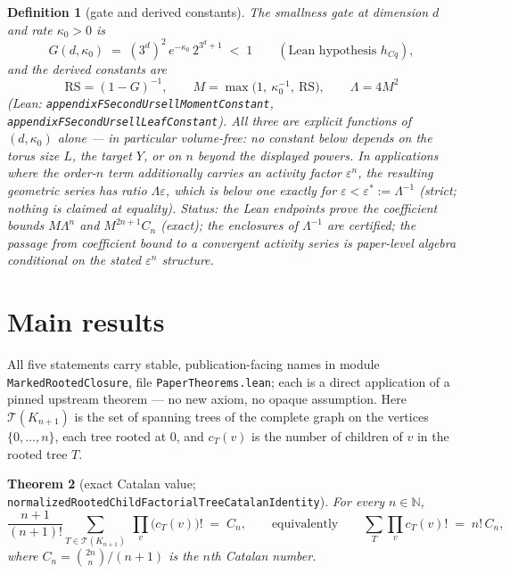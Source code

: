 \documentclass[11pt]{article}
\newtheorem{theorem}{Theorem}[section]
\newtheorem{definition}[theorem]{Definition}
\newcommand{\lean}[1]{\texttt{#1}}
\begin{document}
\begin{definition}[gate and derived constants]\label{def:constants}
The \emph{smallness gate} at dimension $d$ and rate $\kappa_0 > 0$ is
\begin{equation}\label{eq:gate}
G(d,\kappa_0) \;=\; (3^d)^2\, e^{-\kappa_0}\, 2^{3^d+1} \;<\; 1
\qquad (\text{Lean hypothesis } h_{Cq}),
\end{equation}
and the derived constants are
\begin{equation}\label{eq:constants}
\mathrm{RS} = (1-G)^{-1}, \qquad
M = \max\!\bigl(1,\ \kappa_0^{-1},\ \mathrm{RS}\bigr), \qquad
\Lambda = 4M^2
\end{equation}
(Lean: \lean{appendixFSecondUrsellMomentConstant},
\lean{appendixFSecondUrsellLeafConstant}).  All three are explicit
functions of $(d, \kappa_0)$ alone --- in particular
\emph{volume-free}: no constant below depends on the torus size $L$,
the target $Y$, or on $n$ beyond the displayed powers.  In
applications where the order-$n$ term additionally carries an
activity factor
$\varepsilon^n$, the resulting geometric series has ratio
$\Lambda\varepsilon$, which is below one exactly for $\varepsilon <
\varepsilon^* := \Lambda^{-1}$ (strict; nothing is claimed at
equality).  Status: the Lean endpoints prove the coefficient bounds
$M\Lambda^n$ and $M^{2n+1}C_n$ (exact); the enclosures of
$\Lambda^{-1}$ are certified; the passage from coefficient bound to a
convergent activity series is paper-level algebra conditional on the
stated $\varepsilon^n$ structure.
\end{definition}

\section{Main results}\label{sec:results}

All five statements carry stable, publication-facing names in module
\lean{MarkedRootedClosure}, file
\lean{PaperTheorems.lean}; each is a direct
application of a pinned upstream theorem --- no new axiom, no opaque
assumption.  Here $\mathcal{T}(K_{n+1})$ is the set of spanning trees
of the complete graph on the vertices $\{0, \dots, n\}$, each tree
rooted at $0$, and $c_T(v)$ is the number of children of $v$ in the
rooted tree $T$.

\begin{theorem}[exact Catalan value;
\lean{normalizedRootedChildFactorialTreeCatalanIdentity}]
\label{thm:catalanid}
For every $n \in \mathbb{N}$,
\[
\frac{n+1}{(n+1)!}
\sum_{T \in \mathcal{T}(K_{n+1})} \ \prod_{v} \bigl(c_T(v)\bigr)!
\;=\; C_n ,
\qquad\text{equivalently}\qquad
\sum_{T} \prod_v c_T(v)! \;=\; n!\,C_n ,
\]
where $C_n = \binom{2n}{n}/(n+1)$ is the $n$th Catalan number.
\end{theorem}
\end{document}

